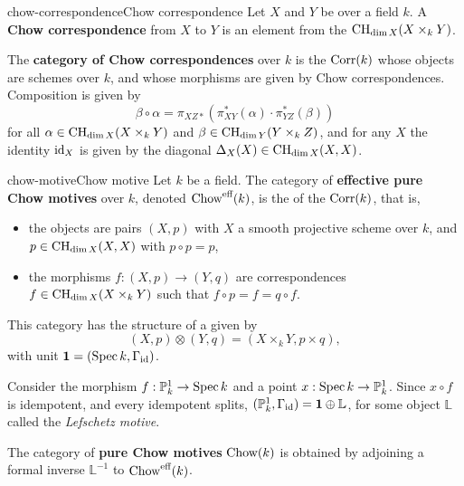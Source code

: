 \begin{topic}{chow-correspondence}{Chow correspondence}
    Let $X$ and $Y$ be  over a field $k$. A \textbf{Chow correspondence} from $X$ to $Y$ is an element from the  $\textup{CH}_{\dim X}(X \times_k Y)$.
    
    The \textbf{category of Chow correspondences} over $k$ is the  $\textup{Corr}(k)$ whose objects are   schemes over $k$, and whose morphisms are given by Chow correspondences. Composition is given by
    \[ \beta \circ \alpha = \pi_{XZ*}(\pi_{XY}^*(\alpha) \cdot \pi_{YZ}^*(\beta)) \]
    for all $\alpha \in \textup{CH}_{\dim X}(X \times_k Y)$ and $\beta \in \textup{CH}_{\dim Y}(Y \times_k Z)$, and for any $X$ the identity $\textup{id}_X$ is given by the diagonal $\Delta_X(X) \in \textup{CH}_{\dim X}(X, X)$.
\end{topic}

\begin{topic}{chow-motive}{Chow motive}
    Let $k$ be a field. The category of \textbf{effective pure Chow motives} over $k$, denoted $\textup{Chow}^\textup{eff}(k)$, is the  of the  $\textup{Corr}(k)$, that is,
    \begin{itemize}
        \item the objects are pairs $(X, p)$ with $X$ a smooth projective scheme over $k$, and $p \in \textup{CH}_{\dim X}(X, X)$ with $p \circ p = p$,
        \item the morphisms $f : (X, p) \to (Y, q)$ are correspondences $f \in \textup{CH}_{\dim X}(X \times_k Y)$ such that $f \circ p = f = q \circ f$.
    \end{itemize}
    This category has the structure of a  given by
    \[ (X, p) \otimes (Y, q) = (X \times_k Y, p \times q) , \]
    with unit $\textbf{1} = (\operatorname{Spec} k, \Gamma_{\textup{id}})$.
    
    Consider the morphism $f : \mathbb{P}^1_k \to \operatorname{Spec} k$ and a point $x : \operatorname{Spec} k \to \mathbb{P}^1_k$. Since $x \circ f$ is idempotent, and every idempotent splits, $(\mathbb{P}^1_k, \Gamma_{\textup{id}}) = \textbf{1} \oplus \mathbb{L}$, for some object $\mathbb{L}$ called the \textit{Lefschetz motive}.
    
    The category of \textbf{pure Chow motives} $\textup{Chow}(k)$ is obtained by adjoining a formal inverse $\mathbb{L}^{-1}$ to $\textup{Chow}^\textup{eff}(k)$.
\end{topic}

